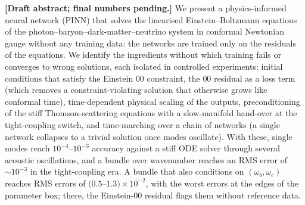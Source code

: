 \textbf{[Draft abstract; final numbers pending.]} We present a physics-informed neural network (PINN) that solves the linearised Einstein--Boltzmann equations of the photon--baryon--dark-matter--neutrino system in conformal Newtonian gauge without any training data: the networks are trained only on the residuals of the equations. We identify the ingredients without which training fails or converges to wrong solutions, each isolated in controlled experiments: initial conditions that satisfy the Einstein $00$ constraint, the $00$ residual as a loss term (which removes a constraint-violating solution that otherwise grows like conformal time), time-dependent physical scaling of the outputs, preconditioning of the stiff Thomson-scattering equations with a slow-manifold hand-over at the tight-coupling switch, and time-marching over a chain of networks (a single network collapses to a trivial solution once modes oscillate). With these, single modes reach $10^{-4}$--$10^{-3}$ accuracy against a stiff ODE solver through several acoustic oscillations, and a bundle over wavenumber reaches an RMS error of $\sim10^{-3}$ in the tight-coupling era. A bundle that also conditions on $(\omega_b,\omega_c)$ reaches RMS errors of $(0.5$--$1.3)\times10^{-2}$, with the worst errors at the edges of the parameter box; there, the Einstein-$00$ residual flags them without reference data. 
